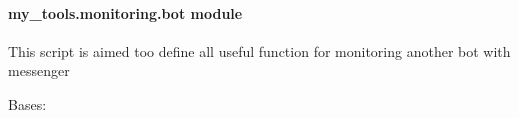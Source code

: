 \documentclass[letterpaper,10pt,english]{sphinxmanual}
\begin{document}
\paragraph{my\_tools.monitoring.bot module}
\label{\detokenize{my_tools.monitoring:module-my_tools.monitoring.bot}}\label{\detokenize{my_tools.monitoring:my-tools-monitoring-bot-module}}
\sphinxAtStartPar
This script is aimed too define all useful function for monitoring another bot with messenger

\begin{fulllineitems}
\label{\detokenize{my_tools.monitoring:my_tools.monitoring.bot.MessageError}}
\sphinxAtStartPar
Bases: 

\end{fulllineitems}

\end{document}
